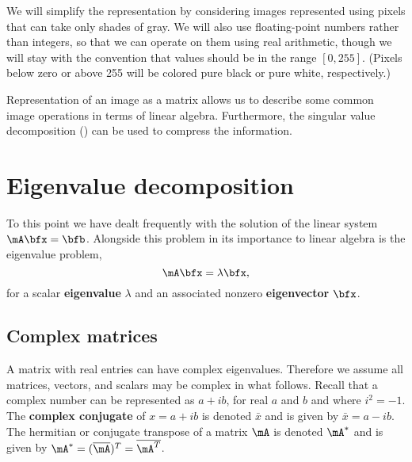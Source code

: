 We will simplify the representation by considering images represented using pixels that can take only shades of gray. We will also use floating-point numbers rather than integers, so that we can operate on them using real arithmetic, though we will stay with the convention that values should be in the range $[0,255]$. (Pixels below zero or above 255 will be colored pure black or pure white, respectively.)

\begin{exam}
\end{exam}

Representation of an image as a matrix allows us to describe some common image operations in terms of linear algebra. Furthermore, the singular value decomposition () can be used to compress the information.




\begin{exercises}
  
\end{exercises}

\clearpage

\section{Eigenvalue decomposition}
\label{sec:evd}

To this point we have dealt frequently with the solution of the linear system $\mA \bfx=\bfb$. Alongside this problem in its importance to linear algebra is the eigenvalue problem,
\begin{equation}
  \label{eq:eigdef}
  \mA \bfx = \lambda \bfx,
\end{equation}
for a scalar  \textbf{eigenvalue} $\lambda$ and an associated nonzero \textbf{eigenvector} $\bfx$.

\subsection{Complex matrices}

A matrix with real entries can have complex eigenvalues. Therefore we assume all matrices, vectors, and scalars may be complex in what follows. Recall that a complex number can be represented as $a+ib$, for real $a$ and $b$ and where $i^2=-1$. The \textbf{complex conjugate} of $x=a+ib$ is denoted $\bar{x}$ and is given by $\bar{x}=a-ib$. The \gls{hermitian} or conjugate transpose of a matrix $\mA$ is denoted $\mA^*$ and is given by $\mA^*=(\overline{\mA})^T=\overline{\mA^T}$.


